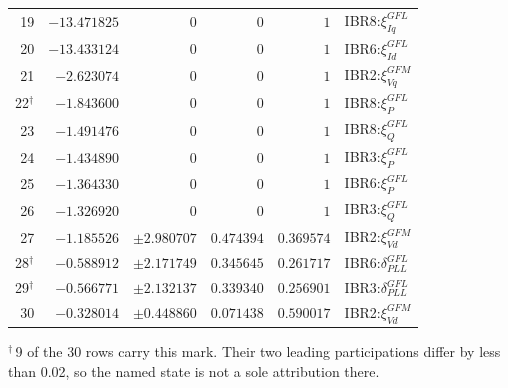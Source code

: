 \begin{longtable}{@{}r r r r r l@{}}
19 & $-13.471825$ & $0$ & $0$ & $1$ & IBR8:$\xi_{Iq}^{GFL}$ \\ 
20 & $-13.433124$ & $0$ & $0$ & $1$ & IBR6:$\xi_{Id}^{GFL}$ \\ 
21 & $-2.623074$ & $0$ & $0$ & $1$ & IBR2:$\xi_{Vq}^{GFM}$ \\ 
22$^{\dagger}$ & $-1.843600$ & $0$ & $0$ & $1$ & IBR8:$\xi_{P}^{GFL}$ \\ 
23 & $-1.491476$ & $0$ & $0$ & $1$ & IBR8:$\xi_{Q}^{GFL}$ \\ 
24 & $-1.434890$ & $0$ & $0$ & $1$ & IBR3:$\xi_{P}^{GFL}$ \\ 
25 & $-1.364330$ & $0$ & $0$ & $1$ & IBR6:$\xi_{P}^{GFL}$ \\ 
26 & $-1.326920$ & $0$ & $0$ & $1$ & IBR3:$\xi_{Q}^{GFL}$ \\ 
27 & $-1.185526$ & $\pm2.980707$ & $0.474394$ & $0.369574$ & IBR2:$\xi_{Vd}^{GFM}$ \\ 
28$^{\dagger}$ & $-0.588912$ & $\pm2.171749$ & $0.345645$ & $0.261717$ & IBR6:$\delta_{PLL}^{GFL}$ \\ 
29$^{\dagger}$ & $-0.566771$ & $\pm2.132137$ & $0.339340$ & $0.256901$ & IBR3:$\delta_{PLL}^{GFL}$ \\ 
30 & $-0.328014$ & $\pm0.448860$ & $0.071438$ & $0.590017$ & IBR2:$\xi_{Vd}^{GFM}$ \\ 
\bottomrule
\end{longtable}
\noindent$^{\dagger}$\,9 of the 30 rows carry this mark. Their two leading participations differ by less than 0.02, so the named state is not a sole attribution there.\par
\endgroup
